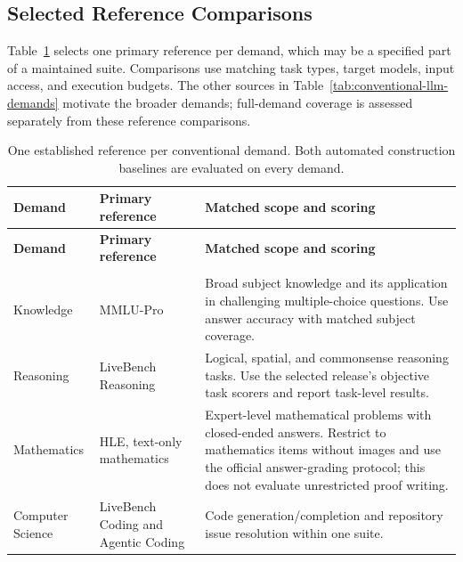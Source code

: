 \documentclass{article} %
\begin{document}
	\subsection{Selected Reference Comparisons}
	
	Table~\ref{tab:conventional-comparisons} selects one primary reference per
	demand, which may be a specified part of a maintained suite. Comparisons use
	matching task types, target models, input access, and execution budgets.
	The other sources in Table~\ref{tab:conventional-llm-demands} motivate the
	broader demands; full-demand coverage is assessed separately from these
	reference comparisons.
	
	\begingroup
	\footnotesize
	\renewcommand{\arraystretch}{1.08}
	\begin{longtable}{@{}>{\raggedright\arraybackslash}p{}>{\raggedright\arraybackslash}p{}>{\raggedright\arraybackslash}p{}@{}}
		\caption{One established reference per conventional demand. Both automated
			construction baselines are evaluated on every demand.}
		\label{tab:conventional-comparisons}\\
		\toprule
		\textbf{Demand} & \textbf{Primary reference} & \textbf{Matched scope and scoring} \\
		\midrule
		\endfirsthead
		\toprule
		\textbf{Demand} & \textbf{Primary reference} & \textbf{Matched scope and scoring} \\
		\midrule
		\endhead
		\midrule
		\multicolumn{3}{r}{\emph{Continued on next page}}\\
		\endfoot
		\bottomrule
		\endlastfoot
		Knowledge & MMLU-Pro~\citep{wang2024mmlupro}
		& Broad subject knowledge and its application in challenging multiple-choice
		questions. Use answer accuracy with matched subject coverage. \\
		\midrule
		Reasoning & LiveBench Reasoning~\citep{white2024livebench,livebenchchangelog}
		& Logical, spatial, and commonsense reasoning tasks. Use the selected release's
		objective task scorers and report task-level results. \\
		\midrule
		Mathematics & HLE, text-only mathematics~\citep{phang2025hle}
		& Expert-level mathematical problems with closed-ended answers. Restrict to
		mathematics items without images and use the official answer-grading protocol;
		this does not evaluate unrestricted proof writing. \\
		\midrule
		Computer Science & LiveBench Coding and Agentic Coding~\citep{white2024livebench,livebenchchangelog}
		& Code generation/completion and repository issue resolution within one suite.

\end{longtable}
\end{document}
